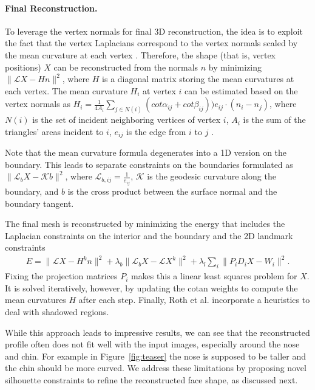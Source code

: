 \paragraph*{Final Reconstruction.} To leverage the vertex normals for final 3D reconstruction, the idea is to exploit the fact that the vertex Laplacians correspond to the vertex normals scaled by the mean curvature at each vertex \cite{Meyer2003}. Therefore, the shape (that is, vertex positions) $X$ can be reconstructed from the normals $n$ by minimizing $ \|\mathcal{L}X-Hn\|^2$, where $H$ is a diagonal matrix storing the mean curvatures at each vertex. The mean curvature $H_i$ at vertex $i$ can be estimated based on the vertex normals as $H_{i}=\frac{1}{4A_{i}} \sum_{j\in N(i)}{(cot\alpha_{ij}+cot\beta_{ij}))e_{ij}\cdot(n_{i}-n_{j})}$, where $N(i)$ is the set of incident neighboring vertices of vertex $i$, $A_{i}$ is the sum of the triangles' areas incident to $i$, $e_{ij}$ is the edge from $i$ to $j$ \cite{Meyer2003}. 

Note that the mean curvature formula degenerates into a 1D version on the boundary. This leads to separate constraints on the boundaries formulated as $\|\mathcal{L}_{b}X- \mathcal{K}b\|^2$, where $\mathcal{L}_{b,ij}=\frac{1}{e_{ij}}$, $\mathcal{K}$ is the geodesic curvature along the boundary, and $b$ is the cross product between the surface normal and the boundary tangent.

The final mesh is reconstructed by minimizing the energy that includes the Laplacian constraints on the interior and the boundary and the 2D landmark constraints
%
\begin{align}
\label{eq:reconstructionenergy}
E=\|\mathcal{L}X - H^{k}n\|^2+\lambda_{b}\|\mathcal{L}_{b}X - \mathcal{L}X^{k}\|^2+  \lambda_{l}\sum_{i}{\|P_{i}D_{i}X-W_{i}\|^2.}
\end{align} 
%
Fixing the projection matrices $P_i$ makes this a linear least squares problem for $X$. It is solved iteratively, however, by updating the cotan weights to compute the mean curvatures $H$ after each step. Finally, Roth et al. \cite{Roth:2015:UFR} incorporate a heuristics to deal with shadowed regions.

While this approach leads to impressive results, we can see that the reconstructed profile often does not fit well with the input images, especially around the nose and chin. For example in Figure~\ref{fig:teaser} the nose is supposed to be taller and the chin should be more curved. We address these limitations by proposing novel silhouette constraints to refine the reconstructed face shape, as discussed next.

